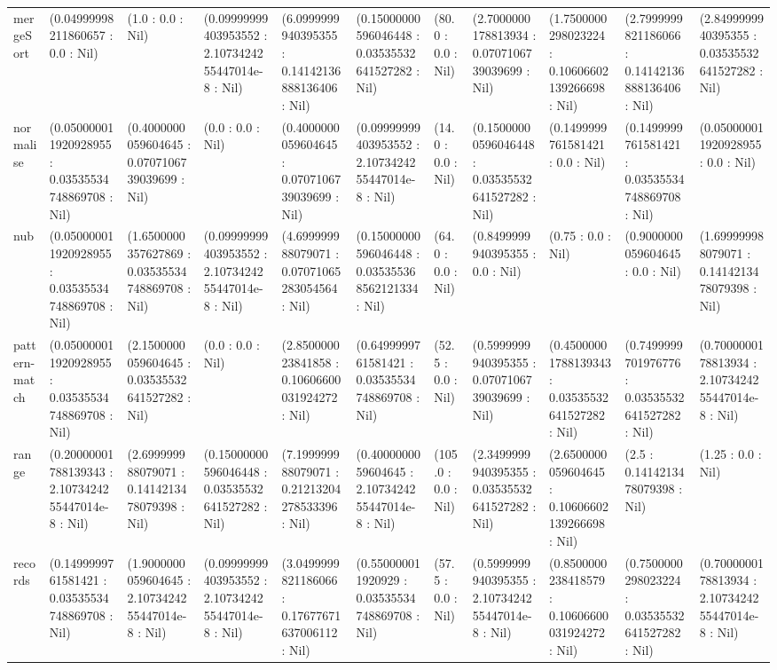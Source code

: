 \begin{table}
\begin{tabular}{lllllllllll}
mergeSort & (0.04999998211860657 : 0.0 : Nil) & (1.0 : 0.0 : Nil) & (0.09999999403953552 : 2.1073424255447014e-8 : Nil) & (6.0999999940395355 : 0.14142136888136406 : Nil) & (0.15000000596046448 : 0.03535532641527282 : Nil) & (80.0 : 0.0 : Nil) & (2.7000000178813934 : 0.0707106739039699 : Nil) & (1.7500000298023224 : 0.10606602139266698 : Nil) & (2.7999999821186066 : 0.14142136888136406 : Nil) & (2.8499999940395355 : 0.03535532641527282 : Nil) \\
normalise & (0.050000011920928955 : 0.03535534748869708 : Nil) & (0.4000000059604645 : 0.0707106739039699 : Nil) & (0.0 : 0.0 : Nil) & (0.4000000059604645 : 0.0707106739039699 : Nil) & (0.09999999403953552 : 2.1073424255447014e-8 : Nil) & (14.0 : 0.0 : Nil) & (0.15000000596046448 : 0.03535532641527282 : Nil) & (0.1499999761581421 : 0.0 : Nil) & (0.1499999761581421 : 0.03535534748869708 : Nil) & (0.050000011920928955 : 0.0 : Nil) \\
nub & (0.050000011920928955 : 0.03535534748869708 : Nil) & (1.6500000357627869 : 0.03535534748869708 : Nil) & (0.09999999403953552 : 2.1073424255447014e-8 : Nil) & (4.699999988079071 : 0.07071065283054564 : Nil) & (0.15000000596046448 : 0.035355368562121334 : Nil) & (64.0 : 0.0 : Nil) & (0.8499999940395355 : 0.0 : Nil) & (0.75 : 0.0 : Nil) & (0.9000000059604645 : 0.0 : Nil) & (1.699999988079071 : 0.1414213478079398 : Nil) \\
pattern-match & (0.050000011920928955 : 0.03535534748869708 : Nil) & (2.1500000059604645 : 0.03535532641527282 : Nil) & (0.0 : 0.0 : Nil) & (2.850000023841858 : 0.10606600031924272 : Nil) & (0.6499999761581421 : 0.03535534748869708 : Nil) & (52.5 : 0.0 : Nil) & (0.5999999940395355 : 0.0707106739039699 : Nil) & (0.45000001788139343 : 0.03535532641527282 : Nil) & (0.7499999701976776 : 0.03535532641527282 : Nil) & (0.7000000178813934 : 2.1073424255447014e-8 : Nil) \\
range & (0.20000001788139343 : 2.1073424255447014e-8 : Nil) & (2.699999988079071 : 0.1414213478079398 : Nil) & (0.15000000596046448 : 0.03535532641527282 : Nil) & (7.199999988079071 : 0.21213204278533396 : Nil) & (0.4000000059604645 : 2.1073424255447014e-8 : Nil) & (105.0 : 0.0 : Nil) & (2.3499999940395355 : 0.03535532641527282 : Nil) & (2.6500000059604645 : 0.10606602139266698 : Nil) & (2.5 : 0.1414213478079398 : Nil) & (1.25 : 0.0 : Nil) \\
records & (0.1499999761581421 : 0.03535534748869708 : Nil) & (1.9000000059604645 : 2.1073424255447014e-8 : Nil) & (0.09999999403953552 : 2.1073424255447014e-8 : Nil) & (3.0499999821186066 : 0.17677671637006112 : Nil) & (0.550000011920929 : 0.03535534748869708 : Nil) & (57.5 : 0.0 : Nil) & (0.5999999940395355 : 2.1073424255447014e-8 : Nil) & (0.8500000238418579 : 0.10606600031924272 : Nil) & (0.7500000298023224 : 0.03535532641527282 : Nil) & (0.7000000178813934 : 2.1073424255447014e-8 : Nil) \\

\end{tabular}
\end{table}
